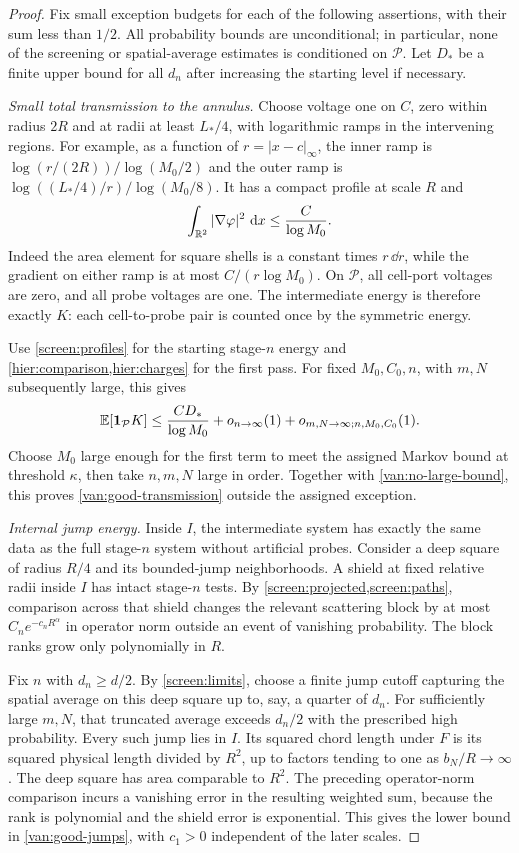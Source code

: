 \begin{proof}
Fix small exception budgets for each of the following assertions, with
their sum less than $1/2$. All probability bounds are unconditional;
in particular, none of the screening or spatial-average estimates is
conditioned on $\mathcal P$. Let $D_*$ be a finite upper bound for all
$d_n$ after increasing the starting level if necessary.

\emph{Small total transmission to the annulus.}
Choose voltage one on $C$, zero within radius $2R$ and at radii at
least $L_*/4$, with logarithmic ramps in the intervening regions.
For example, as a function of $r=|x-c|_\infty$, the inner ramp is
$\log(r/(2R))/\log(M_0/2)$ and the outer ramp is
$\log((L_*/4)/r)/\log(M_0/8)$. It has a compact profile at scale $R$
and
\begin{equation}\label{van:capacity}
 \int_{\mathbb R^2}|\nabla\varphi|^2\,\,\mathrm d x
 \leq\frac{C}{\log M_0}.
\end{equation}
Indeed the area element for square shells is a constant times
$r\,\dd r$, while the gradient on either ramp is at most
$C/(r\log M_0)$. On $\mathcal P$, all cell-port voltages are zero,
and all probe voltages are one. The intermediate energy is therefore
exactly $K$: each cell-to-probe pair is counted once by the symmetric
energy.

Use \cref{screen:profiles} for the starting stage-$n$ energy and
\cref{hier:comparison,hier:charges} for the first pass. For fixed
$M_0,C_0,n$, with $m,N$ subsequently large, this gives
\[
 \mathbb E[\mathbf 1_{\mathcal P}K]
 \leq \frac{CD_*}{\log M_0}
       +o_{n\to\infty}(1)
       +o_{m,N\to\infty;n,M_0,C_0}(1).
\]
Choose $M_0$ large enough for the first term to meet the assigned
Markov bound at threshold $\kappa$, then take $n,m,N$ large in order.
Together with \cref{van:no-large-bound}, this proves
\cref{van:good-transmission} outside the assigned exception.

\emph{Internal jump energy.}
Inside $I$, the intermediate system has exactly the same data as the
full stage-$n$ system without artificial probes. Consider a deep square
of radius $R/4$ and its bounded-jump neighborhoods. A shield at fixed
relative radii inside $I$ has intact stage-$n$ tests. By
\cref{screen:projected,screen:paths}, comparison across that shield
changes the relevant scattering block by at most
$C_n e^{-c_nR^\alpha}$ in operator norm outside an event of vanishing
probability. The block ranks grow only polynomially in $R$.

Fix $n$ with $d_n\geq d/2$. By \cref{screen:limits}, choose a finite
jump cutoff capturing the spatial average on this deep square up to,
say, a quarter of $d_n$. For sufficiently large $m,N$, that truncated
average exceeds $d_n/2$ with the prescribed high probability. Every
such jump lies in $I$. Its squared chord length under $F$ is its
squared physical length divided by $R^2$, up to factors tending to
one as $b_N/R\to\infty$. The deep square has area comparable to
$R^2$. The preceding operator-norm comparison incurs a vanishing
error in the resulting weighted sum, because the rank is polynomial
and the shield error is exponential. This gives the lower bound in
\cref{van:good-jumps}, with $c_1>0$ independent of the later scales.


\end{proof}
